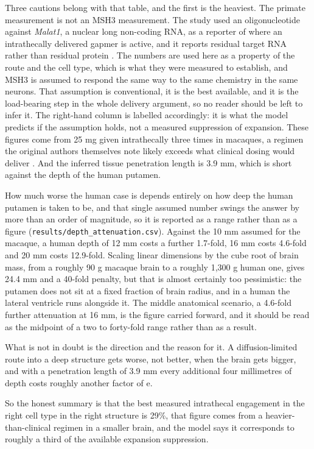 \documentclass[conference]{IEEEtran}
\begin{document}
Three cautions belong with that table, and the first is the heaviest. The primate measurement is not an MSH3 measurement. The study used an oligonucleotide against \textit{Malat1}, a nuclear long non-coding RNA, as a reporter of where an intrathecally delivered gapmer is active, and it reports residual target RNA rather than residual protein \cite{frei}. The numbers are used here as a property of the route and the cell type, which is what they were measured to establish, and MSH3 is assumed to respond the same way to the same chemistry in the same neurons. That assumption is conventional, it is the best available, and it is the load-bearing step in the whole delivery argument, so no reader should be left to infer it. The right-hand column is labelled accordingly: it is what the model predicts if the assumption holds, not a measured suppression of expansion. These figures come from 25 mg given intrathecally three times in macaques, a regimen the original authors themselves note likely exceeds what clinical dosing would deliver \cite{frei}. And the inferred tissue penetration length is 3.9 mm, which is short against the depth of the human putamen.

How much worse the human case is depends entirely on how deep the human putamen is taken to be, and that single assumed number swings the answer by more than an order of magnitude, so it is reported as a range rather than as a figure (\texttt{results/\allowbreak{}depth\_\allowbreak{}attenuation.\allowbreak{}csv}). Against the 10 mm assumed for the macaque, a human depth of 12 mm costs a further 1.7-fold, 16 mm costs 4.6-fold and 20 mm costs 12.9-fold. Scaling linear dimensions by the cube root of brain mass, from a roughly 90 g macaque brain to a roughly 1,300 g human one, gives 24.4 mm and a 40-fold penalty, but that is almost certainly too pessimistic: the putamen does not sit at a fixed fraction of brain radius, and in a human the lateral ventricle runs alongside it. The middle anatomical scenario, a 4.6-fold further attenuation at 16 mm, is the figure carried forward, and it should be read as the midpoint of a two to forty-fold range rather than as a result.

What is not in doubt is the direction and the reason for it. A diffusion-limited route into a deep structure gets worse, not better, when the brain gets bigger, and with a penetration length of 3.9 mm every additional four millimetres of depth costs roughly another factor of e.

So the honest summary is that the best measured intrathecal engagement in the right cell type in the right structure is 29\%, that figure comes from a heavier-than-clinical regimen in a smaller brain, and the model says it corresponds to roughly a third of the available expansion suppression.
\end{document}
